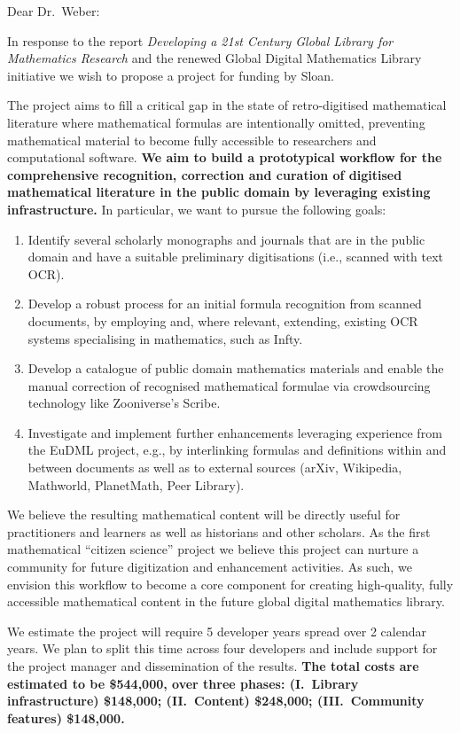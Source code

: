 \documentclass[10pt]{article}
\begin{document}
\thispagestyle{empty}

Dear Dr.~Weber:

In response to the report \emph{Developing a 21st Century Global Library
for Mathematics Research} and the renewed Global Digital
Mathematics Library initiative we wish to propose a project 
for funding by Sloan.

The project aims to fill a critical gap
in the state of retro-digitised mathematical literature
where mathematical formulas are intentionally omitted, preventing
mathematical material  to become fully
accessible to researchers and computational software.
\textbf{We aim to build a prototypical workflow for the comprehensive 
recognition, correction
and curation of digitised mathematical literature in the public domain 
by leveraging existing infrastructure.} In particular, we want to pursue 
the following goals:
\begin{enumerate}
\item Identify several scholarly monographs and journals that are in the public 
domain and have a suitable preliminary digitisations (i.e., scanned with 
text OCR). 
\item Develop a robust process for an initial formula recognition from scanned 
documents, by employing and, where relevant, extending, existing OCR systems 
specialising in mathematics, such as {\sf Infty}.
\item Develop a catalogue of public domain mathematics materials and enable 
the manual correction of recognised mathematical formulae via crowdsourcing 
technology like Zooniverse's {\sf Scribe}.
\item Investigate and implement further enhancements leveraging
experience from the EuDML project, e.g., by
interlinking formulas and definitions within and between documents as well as to 
external sources  (arXiv, Wikipedia, Mathworld, PlanetMath, Peer 
Library).
\end{enumerate}
We believe the resulting mathematical content will be
directly useful for practitioners and learners as well as historians and
other scholars. As the first mathematical ``citizen science'' project we 
believe this project can nurture a community for future digitization and 
enhancement activities. As such, we envision this workflow to become a 
core component for creating high-quality, fully accessible mathematical 
content in the future global digital mathematics library.


We estimate the project will require 5 developer years spread over 2
calendar years. We plan to split this time across four developers and
include support for the project manager and dissemination of the
results.  \textbf{The total costs are estimated to be \$544,000, over
  three phases:
(I.~Library infrastructure) \$148,000;
(II.~Content)               \$248,000;
(III.~Community features)   \$148,000.}
\end{document}
